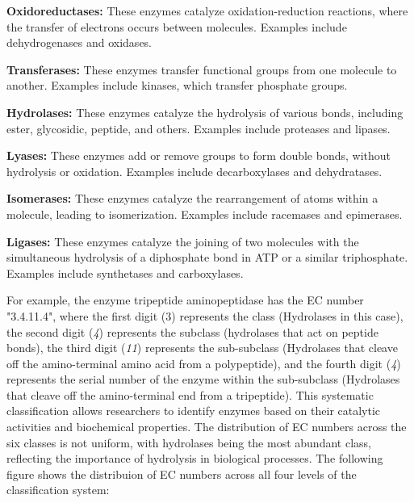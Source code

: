 \begin{compactenum}
    \item \textbf{Oxidoreductases:} These enzymes catalyze oxidation-reduction reactions, where the transfer of electrons occurs between molecules. Examples include dehydrogenases and oxidases.
    \item \textbf{Transferases:} These enzymes transfer functional groups from one molecule to another. Examples include kinases, which transfer phosphate groups.
    \item \textbf{Hydrolases:} These enzymes catalyze the hydrolysis of various bonds, including ester, glycosidic, peptide, and others. Examples include proteases and lipases.
    \item \textbf{Lyases:} These enzymes add or remove groups to form double bonds, without hydrolysis or oxidation. Examples include decarboxylases and dehydratases.
    \item \textbf{Isomerases:} These enzymes catalyze the rearrangement of atoms within a molecule, leading to isomerization. Examples include racemases and epimerases.
    \item \textbf{Ligases:} These enzymes catalyze the joining of two molecules with the simultaneous hydrolysis of a diphosphate bond in ATP or a similar triphosphate. Examples include synthetases and carboxylases.
    
\end{compactenum}

For example, the enzyme tripeptide aminopeptidase has the EC number "3.4.11.4", where the first digit (3) represents the class (Hydrolases in this case), the second digit (\textit{4}) represents the subclass (hydrolases that act on peptide bonds), the third digit (\textit{11}) represents the sub-subclass (Hydrolases that cleave off the amino-terminal amino acid from a polypeptide), and the fourth digit (\textit{4}) represents the serial number of the enzyme within the sub-subclass (Hydrolases that cleave off the amino-terminal end from a tripeptide). This systematic classification allows researchers to identify enzymes based on their catalytic activities and biochemical properties. \autocite{EnzymeNomenclatureRecommendations1994}
The distribution of EC numbers across the six classes is not uniform, with hydrolases being the most abundant class, reflecting the importance of hydrolysis in biological processes. The following figure shows the distribuion of EC numbers across all four levels of the classification system:

